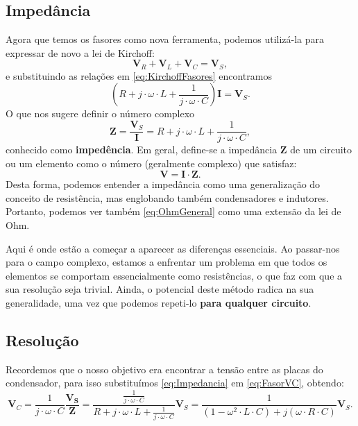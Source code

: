 \subsection{Impedância}
Agora que temos os fasores como nova ferramenta, podemos utilizá-la para expressar de novo a lei de Kirchoff:
\begin{equation}
  \label{eq:KirchoffFasores}
  \mathbf{V}_R + \mathbf{V}_L + \mathbf{V}_C = \mathbf{V}_S,
\end{equation}
e substituindo as relações  em \eqref{eq:KirchoffFasores} encontramos
\[
  \left(R + j\cdot \omega \cdot L + \frac{1}{j\cdot \omega \cdot C}\right) \mathbf{I} = \mathbf{V}_S.
\]
O que nos sugere definir o número complexo
\begin{equation}
  \label{eq:Impedancia}
  \mathbf{Z}=\frac{\mathbf{V}_S}{\mathbf{I}} = R + j\cdot \omega \cdot L + \frac{1}{j\cdot \omega \cdot C},
\end{equation}
conhecido como \textbf{impedência}. Em geral, define-se a impedância $\mathbf{Z}$ de um circuito ou um elemento como o número (geralmente complexo) que satisfaz:
\begin{equation}
  \label{eq:OhmGeneral}
  \mathbf{V} = \mathbf{I}\cdot \mathbf{Z}.
\end{equation}
Desta forma, podemos entender a impedância como uma generalização do conceito de resistência, mas englobando também condensadores e indutores. Portanto, podemos ver também \eqref{eq:OhmGeneral} como uma extensão da lei de Ohm. 

Aqui é onde estão a começar a aparecer as diferenças essenciais. Ao passar-nos para o campo complexo, estamos a enfrentar um problema em que todos os elementos se comportam essencialmente como resistências, o que faz com que a sua resolução seja trivial. Ainda, o potencial deste método radica na sua generalidade, uma vez que podemos repeti-lo \textbf{para qualquer circuito}.


\subsection{Resolução}
 Recordemos que o nosso objetivo era encontrar a tensão entre as placas do condensador, para isso substituímos \eqref{eq:Impedancia} em \eqref{eq:FasorVC}, obtendo:
\begin{equation}
  \label{eq:SolFasor}
  \mathbf{V}_C = \frac{1}{j\cdot \omega \cdot C} \frac{\mathbf{V_S}}{\mathbf{Z}} =\frac{\frac{1}{j\cdot \omega\cdot C}}{R + j\cdot \omega \cdot L + \frac{1}{j\cdot \omega \cdot C}} \mathbf{V}_S = \frac{1}{(1-\omega^2 \cdot L\cdot C) + j(\omega\cdot R\cdot  C)} \mathbf{V}_S.
\end{equation}

